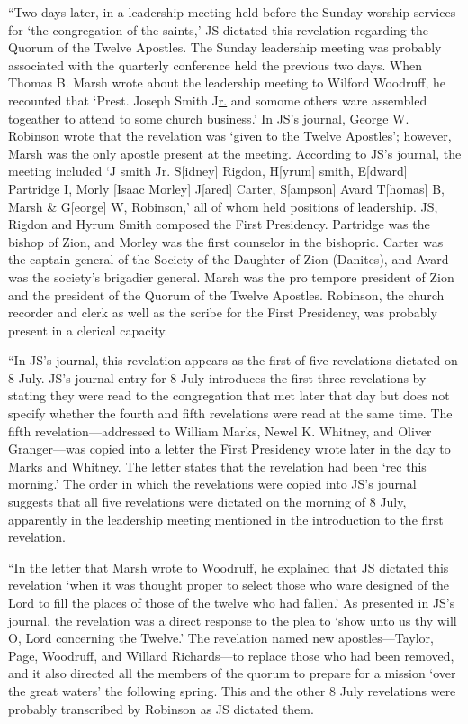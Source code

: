 			``Two days later, in a leadership meeting held before the Sunday worship services for `the congregation of the saints,' JS dictated this revelation regarding the Quorum of the Twelve Apostles. The Sunday leadership meeting was probably associated with the quarterly conference held the previous two days. When Thomas B. Marsh wrote about the leadership meeting to Wilford Woodruff, he recounted that `Prest. Joseph Smith J\uline{r.} and somome others ware assembled togeather to attend to some church business.' In JS's journal, George W. Robinson wrote that the revelation was `given to the Twelve Apostles'; however, Marsh was the only apostle present at the meeting. According to JS's journal, the meeting included `J smith Jr. S[idney] Rigdon, H[yrum] smith, E[dward] Partridge I, Morly [Isaac Morley] J[ared] Carter, S[ampson] Avard T[homas] B, Marsh \& G[eorge] W, Robinson,' all of whom held positions of leadership. JS, Rigdon and Hyrum Smith composed the First Presidency. Partridge was the bishop of Zion, and Morley was the first counselor in the bishopric. Carter was the captain general of the Society of the Daughter of Zion (Danites), and Avard was the society's brigadier general. Marsh was the pro tempore president of Zion and the president of the Quorum of the Twelve Apostles. Robinson, the church recorder and clerk as well as the scribe for the First Presidency, was probably present in a clerical capacity.
			
			``In JS's journal, this revelation appears as the first of five revelations dictated on 8 July. JS's journal entry for 8 July introduces the first three revelations by stating they were read to the congregation that met later that day but does not specify whether the fourth and fifth revelations were read at the same time. The fifth revelation---addressed to William Marks, Newel K. Whitney, and Oliver Granger---was copied into a letter the First Presidency wrote later in the day to Marks and Whitney. The letter states that the revelation had been `rec this morning.' The order in which the revelations were copied into JS's journal suggests that all five revelations were dictated on the morning of 8 July, apparently in the leadership meeting mentioned in the introduction to the first revelation.
			
			``In the letter that Marsh wrote to Woodruff, he explained that JS dictated this revelation `when it was thought proper to select those who ware designed of the Lord to fill the places of those of the twelve who had fallen.' As presented in JS's journal, the revelation was a direct response to the plea to `show unto us thy will O, Lord concerning the Twelve.' The revelation named new apostles---Taylor, Page, Woodruff, and Willard Richards---to replace those who had been removed, and it also directed all the members of the quorum to prepare for a mission `over the great waters' the following spring. This and the other 8 July revelations were probably transcribed by Robinson as JS dictated them.
			
